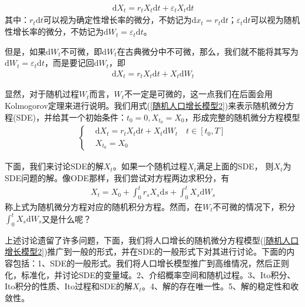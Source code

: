         \begin{align*}
            \mathrm{d}X_t = r_tX_t\mathrm{d}t +\varepsilon_tX_t\mathrm{d}t
        \end{align*}
        其中：$r_t\mathrm{d}t$可以视为确定性增长率的微分，不妨记为$\mathrm{d}x_t = r_t \mathrm{d}t$；$\varepsilon_t\mathrm{d}t$可以视为随机性增长率的微分，不妨记为$\mathrm{d}W_t = \varepsilon_t \mathrm{d}t$。
        \par
        但是，如果$\mathrm{d}W_t$不可微，即$\mathrm{d}W_t$在古典微分中不可微，那么，我们就不能将其写为$\mathrm{d}W_t = \varepsilon_t \mathrm{d}t$，而是要记回$\mathrm{d}W_t$，即
        \begin{align}
            \label{随机人口增长模型2}
            \mathrm{d}X_t = r_tX_t\mathrm{d}t + X_t\mathrm{d}W_t
        \end{align}
        \par
        显然，对于随机过程$W_t$而言，$W_t$不一定是可微的，这一点我们在后面会用Kolmogorov定理来进行说明。我们用式(\ref{随机人口增长模型2})来表示随机微分方程(SDE)，并给其一个初始条件：$t_0 = 0,X_{t_0} = X_0$，形成完整的随机微分方程模型
        \begin{align}
            \label{被规范的方程}
            \left\{
                \begin{aligned}
                        &\mathrm{d}X_t = r_tX_t\mathrm{d}t + X_t\mathrm{d}W_t \quad t\in [t_0,T]\\
                        &X_{t_0} = X_0
                \end{aligned}
            \right.
        \end{align}
        \par
        下面，我们来讨论SDE的解$X_t$。如果一个随机过程$X_t$满足上面的SDE，
        则$X_t$为SDE问题的解。像ODE那样，我们尝试对方程两边求积分，有
        \begin{align*}
            X_t= X_0 + \int_0^tr_s X_s \mathrm{d}s + \int_0^t X_s \mathrm{d}W_s
        \end{align*}
        称上式为随机微分方程对应的随机积分方程。然而，在$W_t$不可微的情况下，积分$\int_0^t X_s \mathrm{d}W_s $又是什么呢？
        \par
        上述讨论遗留了许多问题，下面，我们将人口增长的随机微分方程模型(\ref{随机人口增长模型2})推广到一般的形式，并在SDE的一般形式下对其进行讨论。下面的内容包括：1、SDE的一般形式。我们将人口增长模型推广到高维情况，然后正则化，标准化，并讨论SDE的变量域。2、介绍概率空间和随机过程。3、Ito积分、Ito积分的性质、Ito过程和SDE的解$X_t$。4、解的存在唯一性。5、解的稳定性和收敛性。

